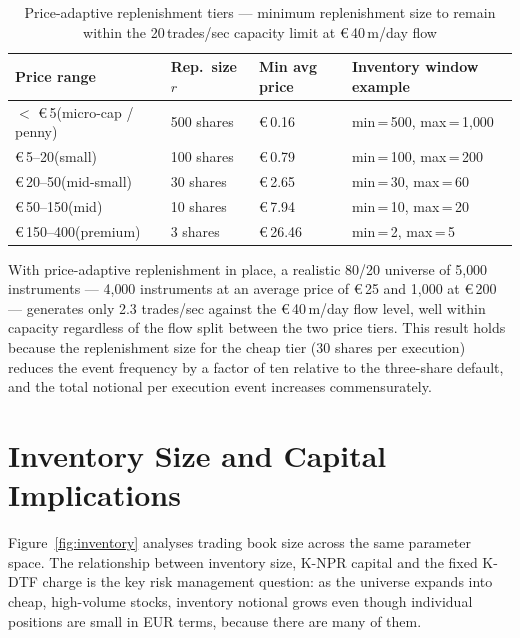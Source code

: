 \documentclass[12pt,a4paper]{report}
\newcommand{\eur}{\euro\,}
\begin{document}
\begin{table}[H]
  \caption{Price-adaptive replenishment tiers --- minimum replenishment size
    to remain within the 20\,trades/sec capacity limit at \eur{}40\,m/day flow}
  \label{tab:reptiers}
  \small
  \begin{tabularx}{\textwidth}{@{}L{4.5cm}R{2.5cm}R{3cm}X@{}}
    \toprule
    \textbf{Price range} & \textbf{Rep.\ size $r$} &
    \textbf{Min avg price} & \textbf{Inventory window example} \\
    \midrule
    $<$ \eur{}5\quad (micro-cap / penny) & 500 shares & \eur{}0.16 &
      min\,=\,500, max\,=\,1{,}000 \\[3pt]
    \eur{}5--20\quad (small)    & 100 shares & \eur{}0.79 &
      min\,=\,100, max\,=\,200 \\[3pt]
    \eur{}20--50\quad (mid-small) &  30 shares & \eur{}2.65 &
      min\,=\,30, max\,=\,60 \\[3pt]
    \eur{}50--150\quad (mid)     &  10 shares & \eur{}7.94 &
      min\,=\,10, max\,=\,20 \\[3pt]
    \eur{}150--400\quad (premium) &   3 shares & \eur{}26.46 &
      min\,=\,2, max\,=\,5 \\
    \bottomrule
  \end{tabularx}
\end{table}

With price-adaptive replenishment in place, a realistic 80/20 universe of
5{,}000 instruments --- 4{,}000 instruments at an average price of \eur{}25 and
1{,}000 at \eur{}200 --- generates only 2.3 trades/sec against the
\eur{}40\,m/day flow level, well within capacity regardless of the flow split
between the two price tiers. This result holds because the replenishment size
for the cheap tier (30 shares per execution) reduces the event frequency by a
factor of ten relative to the three-share default, and the total notional per
execution event increases commensurately.

\section{Inventory Size and Capital Implications}

Figure~\ref{fig:inventory} analyses trading book size across the same parameter
space. The relationship between inventory size, K-NPR capital and the fixed
K-DTF charge is the key risk management question: as the universe expands into
cheap, high-volume stocks, inventory notional grows even though individual
positions are small in EUR terms, because there are many of them.
\end{document}
